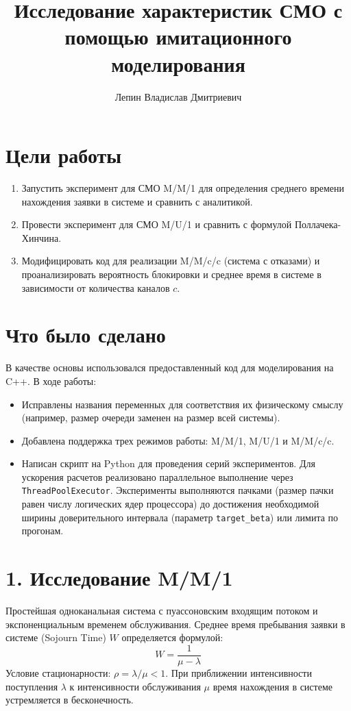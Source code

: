 \documentclass[12pt, a4paper]{article}
\begin{document}
\title{Исследование характеристик СМО с помощью имитационного моделирования}
\author{Лепин Владислав Дмитриевич}
\date{}
\maketitle

\section*{Цели работы}
\begin{enumerate}
    \item Запустить эксперимент для СМО M/M/1 для определения среднего времени нахождения заявки в системе и сравнить с аналитикой.
    \item Провести эксперимент для СМО M/U/1 и сравнить с формулой Поллачека-Хинчина.
    \item Модифицировать код для реализации M/M/c/c (система с отказами) и проанализировать вероятность блокировки и среднее время в системе в зависимости от количества каналов $c$.
\end{enumerate}

\section*{Что было сделано}
В качестве основы использовался предоставленный код для моделирования на C++. В ходе работы:
\begin{itemize}
    \item Исправлены названия переменных для соответствия их физическому смыслу (например, размер очереди заменен на размер всей системы).
    \item Добавлена поддержка трех режимов работы: M/M/1, M/U/1 и M/M/c/c.
    \item Написан скрипт на Python для проведения серий экспериментов. Для ускорения расчетов реализовано параллельное выполнение через \texttt{ThreadPoolExecutor}. Эксперименты выполняются пачками (размер пачки равен числу логических ядер процессора) до достижения необходимой ширины доверительного интервала (параметр \texttt{target\_beta}) или лимита по прогонам.
\end{itemize}

\section*{1. Исследование M/M/1}
Простейшая одноканальная система с пуассоновским входящим потоком и экспоненциальным временем обслуживания. Среднее время пребывания заявки в системе (Sojourn Time) $W$ определяется формулой:
\[ W = \frac{1}{\mu - \lambda} \]
Условие стационарности: $\rho = \lambda/\mu < 1$. При приближении интенсивности поступления $\lambda$ к интенсивности обслуживания $\mu$ время нахождения в системе устремляется в бесконечность.
\end{document}
